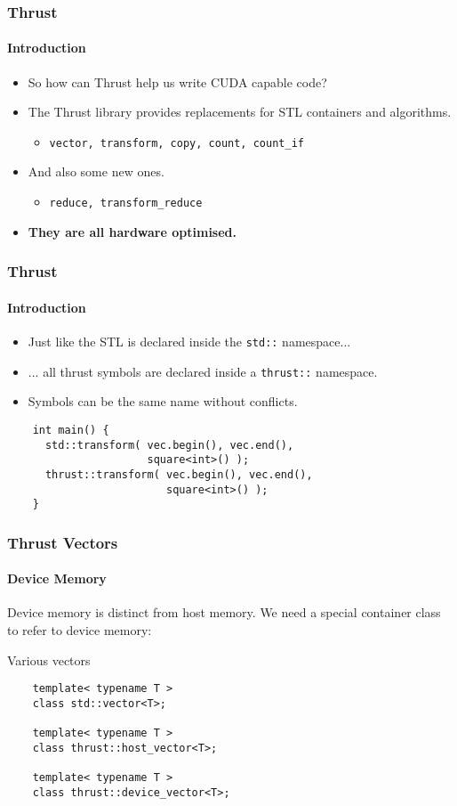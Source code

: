 \begin{frame}[fragile]
  \frametitle{Thrust}
  \framesubtitle{Introduction}
  \begin{itemize}
  \item So how can Thrust help us write CUDA capable code?
  \pause
  \item The Thrust library provides replacements for STL containers and
    algorithms.
    \begin{itemize}
    \item \lstinline|vector, transform, copy, count, count_if|
    \end{itemize}
  \pause
  \item And also some new ones.
    \begin{itemize}
    \item \lstinline|reduce, transform_reduce|
    \end{itemize}
  \pause
  \item {\bf They are all hardware optimised.}
  \end{itemize}
\end{frame}

\begin{frame}[fragile]
  \frametitle{Thrust}
  \framesubtitle{Introduction}
  \begin{itemize}
  \item Just like the STL is declared inside the \lstinline|std::| namespace...
  \item ... all thrust symbols are declared inside a \lstinline|thrust::| namespace.
  \item Symbols can be the same name without conflicts.
  \end{itemize}
  \begin{example}
    \begin{lstlisting}
    int main() {
      std::transform( vec.begin(), vec.end(),
                      square<int>() );
      thrust::transform( vec.begin(), vec.end(),
                         square<int>() );
    }
    \end{lstlisting}
  \end{example}
\end{frame}

\begin{frame}[fragile]
  \frametitle{Thrust Vectors}
  \framesubtitle{Device Memory}
  Device memory is distinct from host memory. We need a special
  container class to refer to device memory:
  \begin{block}{Various vectors}
    \begin{lstlisting}
    template< typename T >
    class std::vector<T>;

    template< typename T >
    class thrust::host_vector<T>;

    template< typename T >
    class thrust::device_vector<T>;
    \end{lstlisting}
  \end{block}
\end{frame}

